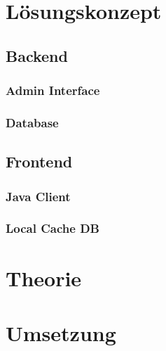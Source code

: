 \documentclass[12pt,a4paper,ngerman,english]{report}
\begin{document}
\subsection{}
\subsection{}

\chapter{Lösungskonzept}
\section{Backend}
\subsection{Admin Interface}
\subsection{Database}
\section{Frontend}
\subsection{Java Client}
\subsection{Local Cache DB}


\chapter{Theorie}
\section{}
\subsection{}
\subsection{}

\chapter{Umsetzung}
\end{document}
